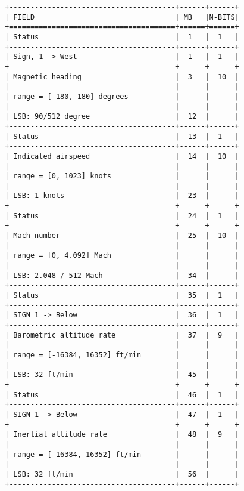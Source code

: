 \begin{verbatim}
+---------------------------------------+------+------+
| FIELD                                 | MB   |N-BITS|
+=======================================+======+======+
| Status                                |  1   |  1   |
+---------------------------------------+------+------+
| Sign, 1 -> West                       |  1   |  1   |
+---------------------------------------+------+------+
| Magnetic heading                      |  3   |  10  |
|                                       |      |      |
| range = [-180, 180] degrees           |      |      |
|                                       |      |      |
| LSB: 90/512 degree                    |  12  |      |
+---------------------------------------+------+------+
| Status                                |  13  |  1   |
+---------------------------------------+------+------+
| Indicated airspeed                    |  14  |  10  |
|                                       |      |      |
| range = [0, 1023] knots               |      |      |
|                                       |      |      |
| LSB: 1 knots                          |  23  |      |
+---------------------------------------+------+------+
| Status                                |  24  |  1   |
+---------------------------------------+------+------+
| Mach number                           |  25  |  10  |
|                                       |      |      |
| range = [0, 4.092] Mach               |      |      |
|                                       |      |      |
| LSB: 2.048 / 512 Mach                 |  34  |      |
+---------------------------------------+------+------+
| Status                                |  35  |  1   |
+---------------------------------------+------+------+
| SIGN 1 -> Below                       |  36  |  1   |
+---------------------------------------+------+------+
| Barometric altitude rate              |  37  |  9   |
|                                       |      |      |
| range = [-16384, 16352] ft/min        |      |      |
|                                       |      |      |
| LSB: 32 ft/min                        |  45  |      |
+---------------------------------------+------+------+
| Status                                |  46  |  1   |
+---------------------------------------+------+------+
| SIGN 1 -> Below                       |  47  |  1   |
+---------------------------------------+------+------+
| Inertial altitude rate                |  48  |  9   |
|                                       |      |      |
| range = [-16384, 16352] ft/min        |      |      |
|                                       |      |      |
| LSB: 32 ft/min                        |  56  |      |
+---------------------------------------+------+------+
\end{verbatim}

